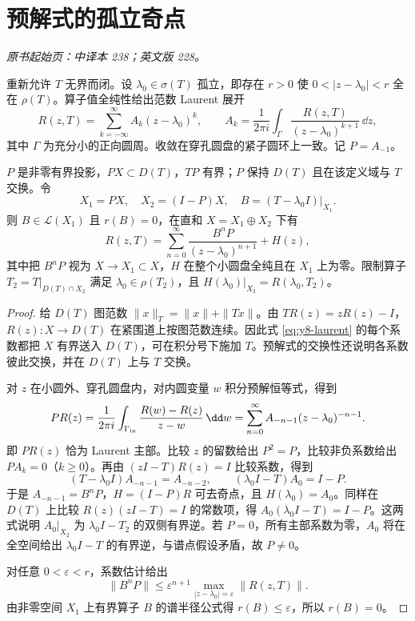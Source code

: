 \section{预解式的孤立奇点}\label{sec:yosida-08-08}
\noindent\textit{原书起始页：中译本 238；英文版 228。}

重新允许 $T$ 无界而闭。设 $\lambda_0\in\sigma(T)$ 孤立，即存在 $r>0$ 使 $0<|z-\lambda_0|<r$ 全在 $\rho(T)$。算子值全纯性给出范数 Laurent 展开
\begin{equation}\label{eq:y8-laurent}
 R(z,T)=\sum_{k=-\infty}^\infty A_k(z-\lambda_0)^k,\qquad
 A_k=\frac1{2\pi i}\int_\Gamma
 \frac{R(z,T)}{(z-\lambda_0)^{k+1}}\,\dd z,
\end{equation}
其中 $\Gamma$ 为充分小的正向圆周。收敛在穿孔圆盘的紧子圆环上一致。记 $P=A_{-1}$。

\begin{theorem}[留数投影与局部分解]\label{thm:y8-riesz-projection}
$P$ 是非零有界投影，$PX\subset D(T)$，$TP$ 有界；$P$ 保持 $D(T)$ 且在该定义域与 $T$ 交换。令
\[
 X_1=PX,\quad X_2=(I-P)X,\quad B=(T-\lambda_0I)|_{X_1}.
\]
则 $B\in\mathcal L(X_1)$ 且 $r(B)=0$，在直和 $X=X_1\oplus X_2$ 下有
\begin{equation}\label{eq:y8-local-resolvent-split}
 R(z,T)=\sum_{n=0}^\infty\frac{B^nP}{(z-\lambda_0)^{n+1}}+H(z),
\end{equation}
其中把 $B^nP$ 视为 $X\to X_1\subset X$，$H$ 在整个小圆盘全纯且在 $X_1$ 上为零。限制算子 $T_2=T|_{D(T)\cap X_2}$ 满足 $\lambda_0\in\rho(T_2)$，且 $H(\lambda_0)|_{X_2}=R(\lambda_0,T_2)$。
\end{theorem}
\begin{proof}
给 $D(T)$ 图范数 $\|x\|_T=\|x\|+\|Tx\|$。由 $TR(z)=zR(z)-I$，$R(z):X\to D(T)$ 在紧围道上按图范数连续。因此式 \eqref{eq:y8-laurent} 的每个系数都把 $X$ 有界送入 $D(T)$，可在积分号下施加 $T$。预解式的交换性还说明各系数彼此交换，并在 $D(T)$ 上与 $T$ 交换。

对 $z$ 在小圆外、穿孔圆盘内，对内圆变量 $w$ 积分预解恒等式，得到
\[
 PR(z)=\frac1{2\pi i}\int_{\Gamma_{\rm in}}
 \frac{R(w)-R(z)}{z-w}\,\dd w
 =\sum_{n=0}^\infty A_{-n-1}(z-\lambda_0)^{-n-1}.
\]
即 $PR(z)$ 恰为 Laurent 主部。比较 $z$ 的留数给出 $P^2=P$，比较非负系数给出 $PA_k=0$（$k\ge0$）。再由
$(zI-T)R(z)=I$ 比较系数，得到
\begin{equation}\label{eq:y8-laurent-recursion}
 (T-\lambda_0I)A_{-n-1}=A_{-n-2},\qquad
 (\lambda_0I-T)A_0=I-P.
\end{equation}
于是 $A_{-n-1}=B^nP$，$H=(I-P)R$ 可去奇点，且 $H(\lambda_0)=A_0$。同样在 $D(T)$ 上比较 $R(z)(zI-T)=I$ 的常数项，得 $A_0(\lambda_0I-T)=I-P$。这两式说明 $A_0|_{X_2}$ 为 $\lambda_0I-T_2$ 的双侧有界逆。若 $P=0$，所有主部系数为零，$A_0$ 将在全空间给出 $\lambda_0I-T$ 的有界逆，与谱点假设矛盾，故 $P\ne0$。

对任意 $0<\varepsilon<r$，系数估计给出
\[
 \|B^nP\|\le\varepsilon^{n+1}
 \max_{|z-\lambda_0|=\varepsilon}\|R(z,T)\|.
\]
由非零空间 $X_1$ 上有界算子 $B$ 的谱半径公式得 $r(B)\le\varepsilon$，所以 $r(B)=0$。
\end{proof}

